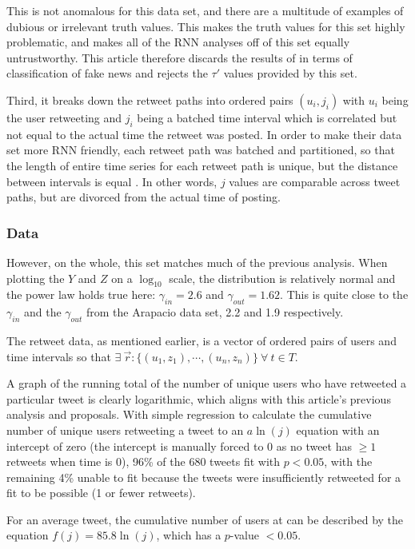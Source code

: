 \documentclass[preprint,review,12pt]{elsarticle}
\begin{document}
This is not anomalous for this data set, and there are a multitude of examples of dubious or irrelevant truth values. This makes the truth values for this set highly problematic, and makes all of the RNN analyses off of this set equally untrustworthy. This article therefore discards the results of \citep{liu2018early,ma2017detect,ma2016detecting,khoo2020interpretable,liu2019early,huang2019deep} in terms of classification of fake news and rejects the $\tau'$ values provided by this set.

Third, it breaks down the retweet paths into ordered pairs $(u_i,j_i)$ with $u_i$ being the user retweeting and $j_i$ being a batched time interval which is correlated but not equal to the actual time the retweet was posted. In order to make their data set more RNN friendly, each retweet path was batched and partitioned, so that the length of entire time series for each retweet path is unique, but the distance between intervals is equal \citep{shu2017fake}. In other words, $j$ values are comparable across tweet paths, but are divorced from the actual time of posting.

 \subsubsection{Data}
However, on the whole, this set matches much of the previous analysis. When plotting the $Y$ and $Z$ on a $\log_{10}$ scale, the distribution is relatively normal and the power law holds true here:  $\gamma_{in} = 2.6$ and $\gamma_{out} = 1.62$. This is quite close to the $\gamma_{in}$ and the $\gamma_{out}$  from the Arapacio data set, 2.2 and 1.9 respectively.

The retweet data, as mentioned earlier, is a vector of ordered pairs of users and time intervals so that $ \exists \ \vec{r}:\{(u_1,z_1), \cdots, (u_n,z_n)\} \ \forall \ t \in T$.

A graph of the running total of the number of unique users who have retweeted a particular tweet is clearly logarithmic, which aligns with this article's previous analysis and proposals. With simple regression to calculate the cumulative number of unique users retweeting a tweet to an $a\ln(j)$ equation with an intercept of zero (the intercept is manually forced to 0 as no tweet has $\geq 1$ retweets when time is 0), 96\% of the 680 tweets fit with $p < 0.05$, with the remaining 4\% unable to fit because the tweets were insufficiently retweeted for a fit to be possible (1 or fewer retweets).   

For an average tweet, the cumulative number of users at can be described by the equation $f(j)=85.8\ln(j)$, which has a $p$-value $< 0.05$. 
\end{document}
